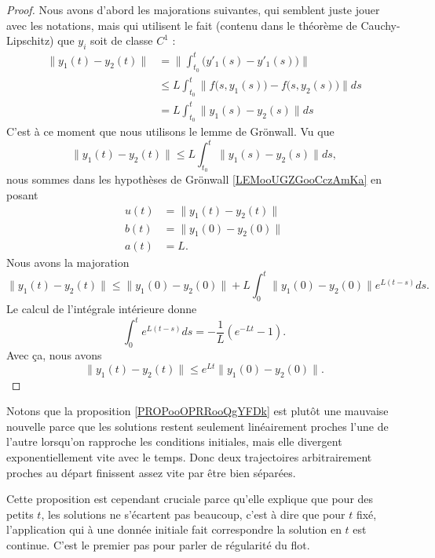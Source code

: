 \begin{proof}
    Nous avons d'abord les majorations suivantes, qui semblent juste jouer avec les notations, mais qui utilisent le fait (contenu dans le théorème de Cauchy-Lipschitz) que \( y_i\) soit de classe \( C^1\) :
    \begin{subequations}
        \begin{align}
            \| y_1(t)-y_2(t) \|&=\| \int_{t_0}^t\big( y'_1(s)-y'_1(s) \big) \|\\
            &\leq L\int_{t_0}^t\| f\big( s,y_1(s) \big)-f\big( s,y_2(s) \big) \|ds\\
            &=L\int_{t_0}^t\| y_1(s)-y_2(s) \|ds
        \end{align}
    \end{subequations}
    C'est à ce moment que nous utilisons le lemme de Grönwall. Vu que
    \begin{equation}
            \| y_1(t)-y_2(t) \|\leq L\int_{t_0}^t\| y_1(s)-y_2(s) \|ds,
    \end{equation}
    nous sommes dans les hypothèses de Grönwall \ref{LEMooUGZGooCczAmKa} en posant
    \begin{subequations}
        \begin{align}
            u(t)&=\| y_1(t)-y_2(t) \|\\
            b(t)&=\| y_1(0)-y_2(0) \|\\
            a(t)&=L.
        \end{align}
    \end{subequations}
    Nous avons la majoration
    \begin{equation}
        \| y_1(t)-y_2(t) \|\leq \| y_1(0)-y_2(0) \|+L\int_0^t\| y_1(0)-y_2(0) \| e^{L(t-s)}ds.
    \end{equation}
    Le calcul de l'intégrale intérieure donne
    \begin{equation}
        \int_0^t e^{L(t-s)}ds=-\frac{1}{ L }( e^{-Lt}-1). 
    \end{equation}
    Avec ça, nous avons
    \begin{equation}
        \| y_1(t)-y_2(t) \|\leq  e^{Lt}\| y_1(0)-y_2(0) \|.
    \end{equation}
\end{proof}

\begin{normaltext}
    Notons que la proposition \ref{PROPooOPRRooQgYFDk} est plutôt une mauvaise nouvelle parce que les solutions restent seulement linéairement proches l'une de l'autre lorsqu'on rapproche les conditions initiales, mais elle divergent exponentiellement vite avec le temps. Donc deux trajectoires arbitrairement proches au départ finissent assez vite par être bien séparées.

   Cette proposition est cependant cruciale parce qu'elle explique que pour des petits \( t\), les solutions ne s'écartent pas beaucoup, c'est à dire que pour \( t\) fixé, l'application qui à une donnée initiale fait correspondre la solution en \( t\) est continue. C'est le premier pas pour parler de régularité du flot.

\end{normaltext}

